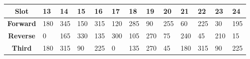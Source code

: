 \documentclass{reportClass}
\begin{document}
\begin{table}[h!]
\begin{tabular}{|cllllllllllll|}
\multicolumn{1}{|c|}{\textbf{Slot}}    & \multicolumn{1}{l|}{\textbf{13}}                         & \multicolumn{1}{l|}{\textbf{14}}                         & \multicolumn{1}{l|}{\textbf{15}}                         & \multicolumn{1}{l|}{\textbf{16}}                         & \multicolumn{1}{l|}{\textbf{17}}                         & \multicolumn{1}{l|}{\textbf{18}}                         & \multicolumn{1}{l|}{\textbf{19}}                         & \multicolumn{1}{l|}{\textbf{20}}                         & \multicolumn{1}{l|}{\textbf{21}}                         & \multicolumn{1}{l|}{\textbf{22}}                         & \multicolumn{1}{l|}{\textbf{23}}                         & \textbf{24}                         \\ \hline
\multicolumn{1}{|c|}{\textbf{Forward}} & \multicolumn{1}{l|}{180}                                 & \multicolumn{1}{l|}{345}                                 & \multicolumn{1}{l|}{150}                                 & \multicolumn{1}{l|}{315}                                 & \multicolumn{1}{l|}{120}                                 & \multicolumn{1}{l|}{285}                                 & \multicolumn{1}{l|}{90}                                  & \multicolumn{1}{l|}{255}                                 & \multicolumn{1}{l|}{60}                                  & \multicolumn{1}{l|}{225}                                 & \multicolumn{1}{l|}{30}                                  & 195                                 \\ \hline
\multicolumn{1}{|c|}{\textbf{Reverse}} & \multicolumn{1}{l|}{0}                                   & \multicolumn{1}{l|}{165}                                 & \multicolumn{1}{l|}{330}                                 & \multicolumn{1}{l|}{135}                                 & \multicolumn{1}{l|}{300}                                 & \multicolumn{1}{l|}{105}                                 & \multicolumn{1}{l|}{270}                                 & \multicolumn{1}{l|}{75}                                  & \multicolumn{1}{l|}{240}                                 & \multicolumn{1}{l|}{45}                                  & \multicolumn{1}{l|}{210}                                 & 15                                  \\ \hline
\multicolumn{1}{|c|}{\textbf{Third}}   & \multicolumn{1}{l|}{180}                                 & \multicolumn{1}{l|}{315}                                 & \multicolumn{1}{l|}{90}                                  & \multicolumn{1}{l|}{225}                                 & \multicolumn{1}{l|}{0}                                   & \multicolumn{1}{l|}{135}                                 & \multicolumn{1}{l|}{270}                                 & \multicolumn{1}{l|}{45}                                  & \multicolumn{1}{l|}{180}                                 & \multicolumn{1}{l|}{315}                                 & \multicolumn{1}{l|}{90}                                  & 225                                 \\ \hline

\end{tabular}
\end{table}
\end{document}

